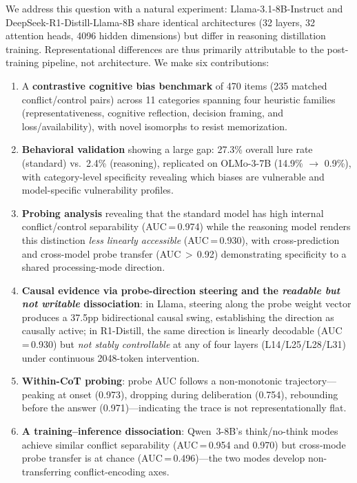 \documentclass{article}
\begin{document}
We address this question with a natural experiment: Llama-3.1-8B-Instruct
and DeepSeek-R1-Distill-Llama-8B share identical architectures (32
layers, 32 attention heads, 4096 hidden dimensions) but differ in
reasoning distillation training.  Representational differences are
thus primarily attributable to the post-training pipeline, not
architecture.  We make six contributions:

\begin{enumerate}[leftmargin=*,itemsep=2pt]
  \item A \textbf{contrastive cognitive bias benchmark} of 470 items
  (235 matched conflict/control pairs) across 11 categories spanning
  four heuristic families (representativeness, cognitive reflection,
  decision framing, and loss/availability), with novel isomorphs to resist
  memorization.

  \item \textbf{Behavioral validation} showing a large gap: 27.3\%
  overall lure rate (standard) vs.\ 2.4\% (reasoning), replicated on
  OLMo-3-7B (14.9\% $\to$ 0.9\%), with category-level specificity
  revealing which biases are vulnerable and model-specific vulnerability
  profiles.

  \item \textbf{Probing analysis} revealing that the standard model has
  high internal conflict/control separability (AUC\,=\,0.974) while the
  reasoning model renders this distinction \emph{less linearly accessible} (AUC\,=\,0.930),
  with cross-prediction and cross-model probe
  transfer (AUC\,$>$\,0.92) demonstrating specificity to a shared
  processing-mode direction.

  \item \textbf{Causal evidence via probe-direction steering and the \emph{readable but not writable} dissociation}: in Llama, steering along the probe weight vector produces a 37.5pp bidirectional causal swing, establishing the direction as causally active; in R1-Distill, the same direction is linearly decodable (AUC\,=\,0.930) but \emph{not stably controllable} at any of four layers (L14/L25/L28/L31) under continuous 2048-token intervention.

  \item \textbf{Within-CoT probing}: probe AUC follows a non-monotonic trajectory---peaking at onset (0.973), dropping during deliberation (0.754), rebounding before the answer (0.971)---indicating the trace is not representationally flat.

  \item \textbf{A training--inference dissociation}: Qwen~3-8B's think/no-think modes achieve similar conflict separability (AUC\,=\,0.954 and 0.970) but cross-mode probe transfer is at chance (AUC\,=\,0.496)---the two modes develop non-transferring conflict-encoding axes.
\end{enumerate}
\end{document}
